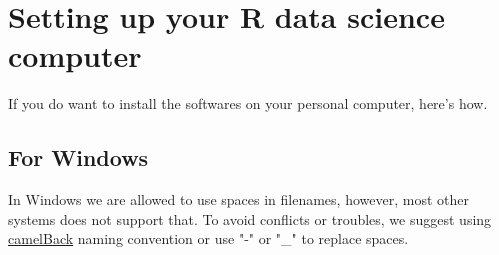 \documentclass[11pt]{article} %
\begin{document}
  
  
  
  
  \pagebreak


\section{Setting up your R data science computer}

If you do want to install the softwares on your personal computer, here's how.

  \subsection{For Windows}
  
  In Windows we are allowed to use spaces in filenames, however, most other systems does not support that. 
  To avoid conflicts or troubles, we suggest using \href{https://sanaulla.info/2008/06/25/camelcase-notation-naming-convention-for-programming-languages/}{camelBack} naming convention or use "-" or "\_" to replace spaces. 
  
\end{document}
